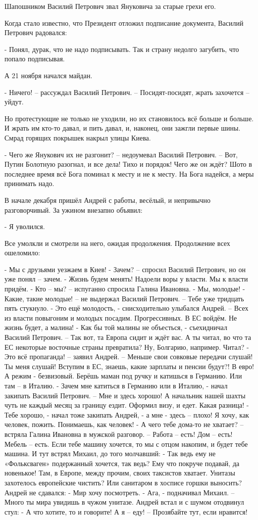 Шапошником Василий Петрович звал Януковича за старые грехи его.

Когда стало известно, что Президент отложил подписание документа, Василий Петрович радовался:

- Понял, дурак, что не надо подписывать. Так и страну недолго загубить, что попало подписывая.

А 21 ноября начался майдан.

- Ничего! – рассуждал Василий Петрович. – Посидят-посидят, жрать захочется – уйдут.

Но протестующие не только не уходили, но их становилось всё больше и больше. И
жрать им кто-то давал, и пить давал, и, наконец, они зажгли первые шины. Смрад
горящих покрышек накрыл улицы Киева.

- Чего же Янукович их не разгонит? – недоумевал Василий Петрович. – Вот, Путин Болотную разогнал, и все дела! Тихо и порядок! Чего же он ждёт? Шото в последнее время всё Бога поминал к месту и не к месту. На Бога надейся, а меры принимать надо.

В начале декабря пришёл Андрей с работы, весёлый, и непривычно разговорчивый. За ужином внезапно объявил:

- Я уволился.

Все умолкли и смотрели на него, ожидая продолжения. Продолжение всех ошеломило:

- Мы с друзьями уезжаем в Киев!
- Зачем? – спросил Василий Петрович, но он уже понял – зачем.
- Жизнь будем менять! Надоели воры у власти. Мы к власти придём.
- Кто – мы? – испуганно спросила Галина Ивановна.
- Мы, молодые!
- Какие, такие молодые! – не выдержал Василий Петрович. – Тебе уже тридцать пять стукнуло.
- Это ещё молодость, - снисходительно улыбался Андрей. – Всех из власти повыгоним и молодых посадим. Прогрессивных. В ЕС войдём. Не жизнь будет, а малина!
- Как бы той малины не объесться, - съехидничал Василий Петрович. – Так вот, та Европа сидит и ждёт вас. А ты читал, во что та ЕС некоторые восточные страны превратила? Ну, Болгарию, например. Читал?
- Это всё пропаганда! – заявил Андрей. – Меньше свои совковые передачи слушай! Ты меня слушай! Вступим в ЕС, знаешь, какие зарплаты и пенсии будут?! В евро! А режим - безвизовый. Берёшь маман под ручку и катишься в Германию. Или там – в Италию.
- Зачем мне катиться в Германию или в Италию, - начал закипать Василий Петрович. – Мне и здесь хорошо! А начальник нашей шахты чуть не каждый месяц за границу ездит. Оформил визу, и едет. Какая разница!
- Тебе хорошо, - начал тоже закипать Андрей, - а мне - здесь – плохо! Я хочу, как человек, пожить. Понимаешь, как человек!
- А чего тебе дома-то не хватает? – встряла Галина Ивановна в мужской разговор. – Работа – есть! Дом – есть! Мебель – есть. Если тебе машину хочется, то мы с отцом накопим, и будет тебе машина.
И тут встрял Михаил, до того молчавший:
- Так ведь ему не «Фольксваген» подержанный хочется, так ведь? Ему что покруче подавай, да новенькое! Там, в Европе, между прочим, своих таксистов хватает. Унитазы захотелось европейские чистить? Или санитаром в хосписе горшки выносить?
Андрей не сдавался:
- Мир хочу посмотреть.
- Ага, - подначивал Михаил. – Много ты мира увидишь в чужом унитазе.
Андрей встал и с шумом отодвинул стул:
- А что хотите, то и говорите! А я – еду! – Прозябайте тут, если нравится!

